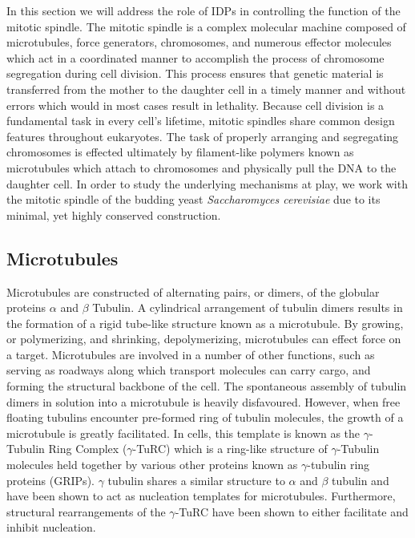In this section we will address the role of IDPs in controlling the function of the mitotic spindle. The mitotic spindle is a complex molecular machine composed of microtubules, force generators, chromosomes, and numerous effector molecules which act in a coordinated manner to accomplish the process of chromosome segregation during cell division. This process ensures that genetic material is transferred from the mother to the daughter cell in a timely manner and without errors which would in most cases result in lethality. Because cell division is a fundamental task in every cell's lifetime, mitotic spindles share common design features throughout eukaryotes. The task of properly arranging and segregating chromosomes is effected ultimately by filament-like polymers known as microtubules which attach to chromosomes and physically pull the DNA to the daughter cell. In order to study the underlying mechanisms at play, we work with the mitotic spindle of the budding yeast {\it Saccharomyces cerevisiae} due to its minimal, yet highly conserved construction. 

\subsection{Microtubules}

Microtubules are constructed of alternating pairs, or dimers, of the globular proteins $\alpha$ and $\beta$ Tubulin. A cylindrical arrangement of tubulin dimers results in the formation of a rigid tube-like structure known as a microtubule. By growing, or polymerizing, and shrinking, depolymerizing, microtubules can effect force on a target. Microtubules are involved in a number of other functions, such as serving as roadways along which transport molecules can carry cargo, and forming the structural backbone of the cell. The spontaneous assembly of tubulin dimers in solution into a microtubule is heavily disfavoured. However, when free floating tubulins encounter pre-formed ring of tubulin molecules, the growth of a microtubule is greatly facilitated. In cells, this template is known as the $\gamma$-Tubulin Ring Complex ($\gamma$-TuRC) which is a ring-like structure of $\gamma$-Tubulin molecules held together by various other proteins known as $\gamma$-tubulin ring proteins (GRIPs). $\gamma$ tubulin shares a similar structure to $\alpha$ and $\beta$ tubulin and have been shown to act as nucleation templates for microtubules. Furthermore, structural rearrangements of the $\gamma$-TuRC have been shown to either facilitate and inhibit nucleation. 

